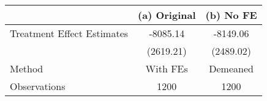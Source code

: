\begin{tabular}{l*{2}{c}}
\hline\hline
                    &\multicolumn{1}{c}{(a) Original}&\multicolumn{1}{c}{(b) No FE}\\
\hline
Treatment Effect Estimates&    -8085.14&    -8149.06\\
                    &   (2619.21)&   (2489.02)\\
\hline
Method              &    With FEs&    Demeaned\\
Observations        &        1200&        1200\\
\hline\hline
\end{tabular}
